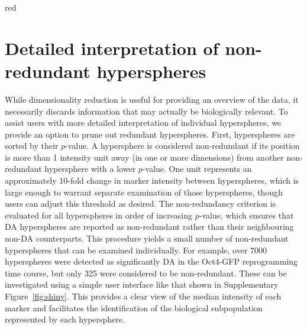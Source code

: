 \documentclass{article}
\begin{document}
\begin{color}{red}
\section{Detailed interpretation of non-redundant hyperspheres}
While dimensionality reduction is useful for providing an overview of the data, it necessarily discards information that may actually be biologically relevant.
To assist users with more detailed interpretation of individual hyperspheres, we provide an option to prune out redundant hyperspheres.
First, hyperspheres are sorted by their $p$-value.
A hypersphere is considered non-redundant if its position is more than 1 intensity unit away (in one or more dimensions) from another non-redundant hypersphere with a lower $p$-value.
One unit represents an approximately 10-fold change in marker intensity between hyperspheres, which is large enough to warrant separate examination of those hyperspheres, though users can adjust this threshold as desired.
The non-redundancy criterion is evaluated for all hyperspheres in order of increasing $p$-value, which ensures that DA hyperspheres are reported as non-redundant rather than their neighbouring non-DA counterparts.
This procedure yields a small number of non-redundant hyperspheres that can be examined individually.
For example, over 7000 hyperspheres were detected as significantly DA in the Oct4-GFP reprogramming time course, but only 325 were considered to be non-redundant.
These can be investigated using a simple user interface like that shown in Supplementary Figure~\ref{fig:shiny}.
This provides a clear view of the median intensity of each marker and facilitates the identification of the biological subpopulation represented by each hypersphere.

\end{color}

\newcommand{\hi}{\textsuperscript{high}}
\newcommand{\lo}{\textsuperscript{low}}
\end{document}
